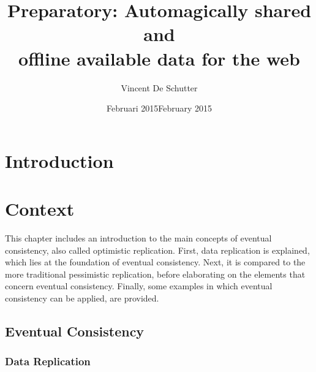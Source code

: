 \documentclass[a4paper,12pt]{report}
\author{Vincent De Schutter}
\title{Preparatory: Automagically shared and \\offline available data for the web}
\date{Februari 2015}
\begin{document}


\date{February 2015}

\maketitlepage


\tableofcontents
\newpage

\chapter{Introduction}\label{cha:Introduction} %



\chapter{Context}\label{cha:Context} %

This chapter includes an introduction to the main concepts of eventual consistency, also called optimistic replication. First, data replication is explained, which lies at the foundation of eventual consistency. Next, it is compared to the more traditional pessimistic replication, before elaborating on the elements that concern eventual consistency. Finally, some examples in which eventual consistency can be applied, are provided.

\section{Eventual Consistency}\label{sec:EventualConsistency}


\subsection{Data Replication}
\end{document}
